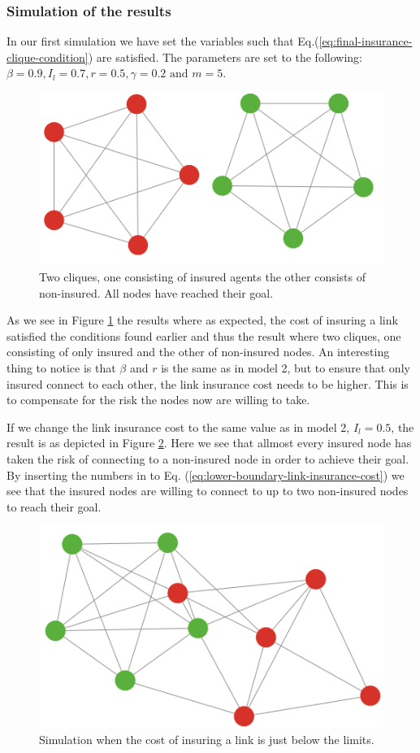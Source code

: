 \subsubsection{Simulation of the results}
In our first simulation we have set the variables such that Eq.(\ref{eq:final-insurance-clique-condition}) are satisfied. The parameters are set to the following: $\beta=0.9, I_{l}=0.7, r=0.5, \gamma=0.2 \text{ and }m=5$.

\begin{figure}[h]
\centering
  \includegraphics[width=0.8\linewidth]{../Figures/BonusGameInsuredClique.png}
  \caption{\label{fig:bonusoptimal} Two cliques, one consisting of insured agents the other consists of non-insured. All nodes have reached their goal. }
\end{figure}
As we see in Figure \ref{fig:bonusoptimal} the results where as expected, the cost of insuring a link satisfied the conditions found earlier and thus the result where two cliques, one consisting of only insured and the other of non-insured nodes.
An interesting thing to notice is that $\beta$ and $r$ is the same as in model 2, but to ensure that only insured connect to each other, the link insurance cost needs to be higher. This is to compensate for the risk the nodes now are willing to take. 

If we change the link insurance cost to the same value as in model 2, $I_{l}=0.5$, the result is  as depicted in Figure \ref{fig:bonusviolating}. Here we see that allmost every insured node has taken the risk of connecting to a non-insured node in order to achieve their goal. By inserting the numbers in to Eq. (\ref{eq:lower-boundary-link-insurance-cost}) we see that the insured nodes are willing to connect to up to two non-insured nodes to reach their goal.

\begin{figure}[h]
\centering
  \includegraphics[width=0.8\linewidth]{../Figures/BonusGameViolating.png}
  \caption{\label{fig:bonusviolating} Simulation when the cost of insuring a link is just below the limits. }
\end{figure}


